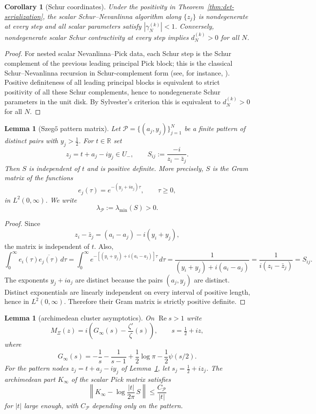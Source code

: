 \documentclass[11pt]{amsart}
\newtheorem{lemma}[theorem]{Lemma}
\newtheorem{corollary}[theorem]{Corollary}
\theoremstyle{definition}
\theoremstyle{remark}
\theoremstyle{definition}
\renewcommand{\Re}{\operatorname{Re}}
\newcommand{\half}{\tfrac{1}{2}}
\newcommand{\R}{\mathbb{R}}
\begin{document}
\begin{corollary}[Schur coordinates]\label{cor:schur-coords}
Under the positivity in Theorem~\ref{thm:det-serialization}, the scalar Schur--Nevanlinna algorithm
along $\{z_j\}$ is nondegenerate at every step and all scalar parameters satisfy
$|\gamma_N^{(k)}|<1$.  Conversely, nondegenerate scalar Schur contractivity at every step implies
$d_N^{(k)}>0$ for all $N$.
\end{corollary}

\begin{proof}
For nested scalar Nevanlinna--Pick data, each Schur step is the Schur complement of the previous leading
principal Pick block; this is the classical Schur--Nevanlinna recursion in Schur-complement form
(see, for instance, \cite{FoiasFrazho}).  Positive definiteness of all leading principal blocks is equivalent to strict
positivity of all these Schur complements, hence to nondegenerate Schur parameters in the unit disk.  By
Sylvester's criterion this is equivalent to $d_N^{(k)}>0$ for all $N$.
\end{proof}

\begin{lemma}[Szeg\H{o} pattern matrix]\label{lem:szego-pattern}
Let $\mathcal P=\{(a_j,y_j)\}_{j=1}^N$ be a finite pattern of distinct pairs with
$y_j>\half$.  For $t\in\R$ set
\[
   z_j=t+a_j-iy_j\in U_-,
   \qquad
   S_{ij}:=\frac{-i}{z_i-\bar z_j}.
\]
Then $S$ is independent of $t$ and is positive definite.  More precisely, $S$ is the Gram matrix of
the functions
\[
   e_j(\tau)=e^{-(y_j+ia_j)\tau},\qquad \tau\ge0,
\]
in $L^2(0,\infty)$.  We write
\[
   \lambda_{\mathcal P}:=\lambda_{\min}(S)>0.
\]
\end{lemma}

\begin{proof}
Since
\[
   z_i-\bar z_j=(a_i-a_j)-i(y_i+y_j),
\]
the matrix is independent of $t$.  Also,
\[
   \int_0^\infty e_i(\tau)\overline{e_j(\tau)}\,d\tau
   =
   \int_0^\infty e^{-[(y_i+y_j)+i(a_i-a_j)]\tau}\,d\tau
   =
   \frac{1}{(y_i+y_j)+i(a_i-a_j)}
   =
   \frac{1}{i(z_i-\bar z_j)}
   =
   S_{ij}.
\]
The exponents $y_j+ia_j$ are distinct because the pairs $(a_j,y_j)$ are distinct.  Distinct
exponentials are linearly independent on every interval of positive length, hence in
$L^2(0,\infty)$.  Therefore their Gram matrix is strictly positive definite.
\end{proof}

\begin{lemma}[archimedean cluster asymptotics]\label{lem:arch-cluster}
On $\Re s>1$ write
\[
   M_\Xi(z)=i\left(G_\infty(s)-\frac{\zeta'}{\zeta}(s)\right),
   \qquad s=\half+iz,
\]
where
\[
   G_\infty(s)
   =
   -\frac1s-\frac1{s-1}+\frac12\log\pi-\frac12\psi(s/2).
\]
For the pattern nodes $z_j=t+a_j-iy_j$ of Lemma~\ref{lem:szego-pattern}, let
$s_j=\half+iz_j$.  The archimedean part $K_\infty$ of the scalar Pick matrix satisfies
\[
   \left\|
      K_\infty-\log\frac{|t|}{2\pi}\,S
   \right\|
   \le
   \frac{C_{\mathcal P}}{|t|}
\]
for $|t|$ large enough, with $C_{\mathcal P}$ depending only on the pattern.
\end{lemma}
\end{document}
